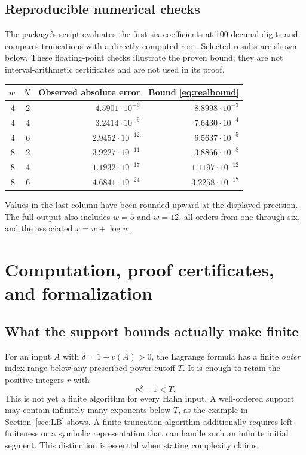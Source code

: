 \documentclass[11pt,a4paper]{article}
\theoremstyle{definition}
\theoremstyle{remark}
\begin{document}
\subsection{Reproducible numerical checks}
The package's script evaluates the first six coefficients at 100 decimal
digits and compares truncations with a directly computed root. Selected
results are shown below. These floating-point checks illustrate the proven
bound; they are not interval-arithmetic certificates and are not used in its
proof.
\begin{center}
\begin{tabular}{@{}rrrr@{}}
\toprule
$w$ & $N$ & Observed absolute error & Bound \eqref{eq:realbound}\\
\midrule
4 & 2 & $4.5901\cdot10^{-6}$ & $8.8998\cdot10^{-3}$\\
4 & 4 & $3.2414\cdot10^{-9}$ & $7.6430\cdot10^{-4}$\\
4 & 6 & $2.9452\cdot10^{-12}$ & $6.5637\cdot10^{-5}$\\
8 & 2 & $3.9227\cdot10^{-11}$ & $3.8866\cdot10^{-8}$\\
8 & 4 & $1.1932\cdot10^{-17}$ & $1.1197\cdot10^{-12}$\\
8 & 6 & $4.6841\cdot10^{-24}$ & $3.2258\cdot10^{-17}$\\
\bottomrule
\end{tabular}
\end{center}
Values in the last column have been rounded upward at the displayed
precision. The full output also includes $w=5$ and $w=12$, all orders from
one through six, and the associated $x=w+\log w$.

\section{Computation, proof certificates, and formalization}
\label{sec:computational}

\subsection{What the support bounds actually make finite}
For an input $A$ with $\delta=1+v(A)>0$, the Lagrange formula has a finite
\emph{outer} index range below any prescribed power cutoff $T$. It is enough
to retain the positive integers $r$ with
\[
 r\delta-1<T.
\]
This is not yet a finite algorithm for every Hahn input. A well-ordered
support may contain infinitely many exponents below $T$, as the example
in Section~\ref{sec:LB} shows. A finite truncation algorithm additionally
requires left-finiteness or a symbolic representation that can handle such
an infinite initial segment. This distinction is essential when stating
complexity claims.
\end{document}
